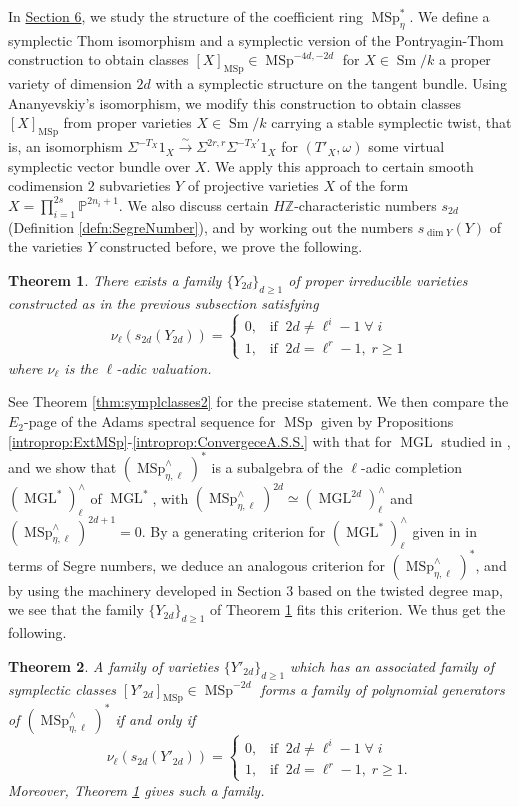 \documentclass[10pt]{amsart}
\theoremstyle{definition}
\theoremstyle{plain}
\newtheorem{introthm}{Theorem}
\numberwithin{equation}{section}
\newcommand{\0}{\emptyset}
\renewcommand{\P}{{\mathbb P}}
\newcommand{\Z}{{\mathbb Z}}
\newcommand{\MGL}{{\operatorname{MGL}}}
\newcommand{\MSp}{{\operatorname{MSp}}}
\newcommand{\Sm}{{\operatorname{Sm}}}
\renewcommand{\dim}{{\operatorname{dim}}}
\begin{document}
In \underline{Section 6}, we study the structure of the coefficient ring $\MSp_\eta^*$. We define a symplectic Thom isomorphism and a symplectic version of the Pontryagin-Thom construction to obtain classes $[X]_\MSp \in \MSp^{-4d,-2d}$ for $X \in \Sm/k$ a proper variety of dimension $2d$ with a symplectic structure on the tangent bundle. Using Ananyevskiy's isomorphism, we modify this construction to obtain classes $[X]_\MSp$ from proper varieties $X \in \Sm/k$ carrying a stable symplectic twist, that is, an isomorphism $\Sigma^{-T_X}1_X \xrightarrow{\sim}\Sigma^{2r,r}\Sigma^{-T_X'}1_X$ for $(T'_X,\omega)$ some virtual symplectic vector bundle over $X$. We apply this approach to certain smooth codimension $2$ subvarieties $Y$ of projective varieties $X$ of the form $X=\prod_{i=1}^{2s}\P^{2n_i+1}$. We also discuss certain $H\Z$-characteristic numbers $s_{2d}$ (Definition \ref{defn:SegreNumber}), and by working out the numbers $s_{\dim Y}(Y)$ of the varieties $Y$ constructed before, we prove the following.
\begin{introthm}
\label{introthm:SegreNumbers}
    There exists a family $\{Y_{2d}\}_{d \ge 1}$ of proper irreducible varieties constructed as in the previous subsection satisfying
    $$\nu_{\ell}(s_{2d}(Y_{2d}))=
    \begin{cases}
        0, \; \; \; \text{if} \;\;  2d \neq \ell^i-1 \; \forall \; i \\
        1, \; \; \; \text{if} \; \; 2d=\ell^r -1, \; r \ge 1
    \end{cases}$$
    where $\nu_\ell$ is the $\ell$-adic valuation.
\end{introthm}
See Theorem \ref{thm:symplclasses2} for the precise statement. We then compare the $E_2$-page of the Adams spectral sequence for $\MSp$ given by Propositions \ref{introprop:ExtMSp}-\ref{introprop:ConvergeceA.S.S.} with that for $\MGL$ studied in \cite{lev:ellcoh}, and we show that $(\MSp^\wedge_{\eta,\ell})^*$ is a subalgebra of the $\ell$-adic completion $(\MGL^*)^\wedge_\ell$ of $\MGL^*$, with $(\MSp^\wedge_{\eta,\ell})^{2d} \simeq (\MGL^{2d})^\wedge_\ell$ and $(\MSp^\wedge_{\eta,\ell})^{2d+1}=0$. By a generating criterion for $(\MGL^*)^\wedge_\ell$ given in \cite{lev:ellcoh} in terms of Segre numbers, we deduce an analogous criterion for $(\MSp^\wedge_{\eta,\ell})^*$, and by using the machinery developed in Section 3 based on the twisted degree map, we see that the family $\{Y_{2d}\}_{d \ge 1}$ of Theorem \ref{introthm:SegreNumbers} fits this criterion. We thus get the following.
\begin{introthm}
\label{introthm:finalResult}
    A family of varieties $\{Y'_{2d}\}_{d \ge 1}$ which has an associated family of symplectic classes $[Y'_{2d}]_{\MSp}\in \MSp^{-2d}$ forms a family of polynomial generators of $(\MSp_{\eta,\ell}^\wedge)^*$ if and only if 
    $$\nu_{\ell}(s_{2d}(Y'_{2d}))=
    \begin{cases}
        0, \; \; \; \text{if} \;\;  2d \neq \ell^i-1 \; \forall \; i \\
        1, \; \; \; \text{if} \; \; 2d=\ell^r -1, \; r \ge 1.
    \end{cases}$$
    Moreover, Theorem \ref{introthm:SegreNumbers} gives such a family.
\end{introthm}
\end{document}
